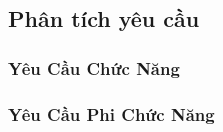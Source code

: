 \subsection{\textbf{Phân tích yêu cầu}}

\subsubsection{Yêu Cầu Chức Năng}







\subsubsection{Yêu Cầu Phi Chức Năng}

